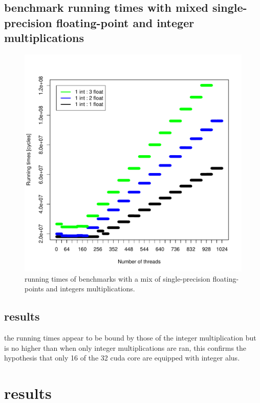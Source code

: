 \documentclass{report}
\def \scalingfactor{.8}
\begin{document}
	\subsection{benchmark running times with mixed single-precision floating-point and integer multiplications}
	\begin{figure}[h]
		\centering
		\vspace{-20pt}
        \includegraphics[width=\scalingfactor\linewidth]{"graphics/running_times_mixed"}
		\vspace{-15pt}
		\captionsetup{justification=centering}
        \caption{running times of benchmarks with a mix of single-precision floating-points and integers multiplications.}
    \end{figure}

    \subsection{results}
    the running times appear to be bound by those of the integer multiplication but is no higher than
    when only integer multiplications are ran, this confirms the hypothesis that only 16 of the 32
    cuda core are equipped with integer alus. 

\section{results}
\end{document}
